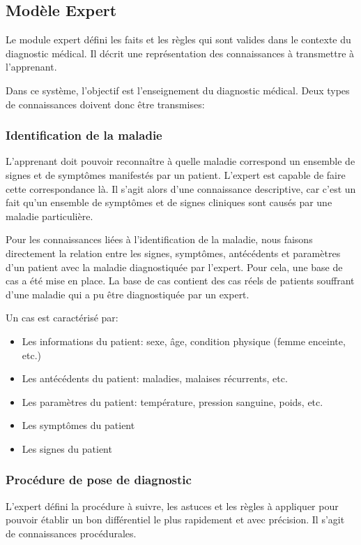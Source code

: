     \subsection{Modèle Expert}
    Le module expert défini les faits et les règles qui sont valides dans le contexte du diagnostic médical. Il décrit une représentation des connaissances à transmettre à l'apprenant.
    
    Dans ce système, l'objectif est l'enseignement du diagnostic médical. 
    Deux types de connaissances doivent donc être transmises:

    
    \subsubsection{Identification de la maladie}
    L'apprenant doit pouvoir reconnaître à quelle maladie correspond un ensemble de signes et de symptômes manifestés par un patient. L'expert est capable de faire cette correspondance là. Il s'agit alors d'une connaissance descriptive, car c'est un fait qu'un ensemble de symptômes et de signes cliniques sont causés par une maladie particulière.
    
    Pour les connaissances liées à l'identification de la maladie, nous faisons directement la relation entre les signes, symptômes, antécédents et paramètres d'un patient avec la maladie diagnostiquée par l'expert. Pour cela, une base de cas a été mise en place. La base de cas contient des cas réels de patients souffrant d'une maladie qui a pu être diagnostiquée par un expert.
    
    Un cas est caractérisé par:
    \begin{itemize}
        \item Les informations du patient: sexe, âge, condition physique (femme enceinte, etc.)
        \item Les antécédents du patient: maladies, malaises récurrents, etc.
        \item Les paramètres du patient: température, pression sanguine, poids, etc.
        \item Les symptômes du patient
        \item Les signes du patient
    \end{itemize}
    
    
    \subsubsection{Procédure de pose de diagnostic}
    L'expert défini la procédure à suivre, les astuces et les règles à appliquer pour pouvoir établir un bon différentiel le plus rapidement et avec précision. Il s'agit de connaissances procédurales.
    
